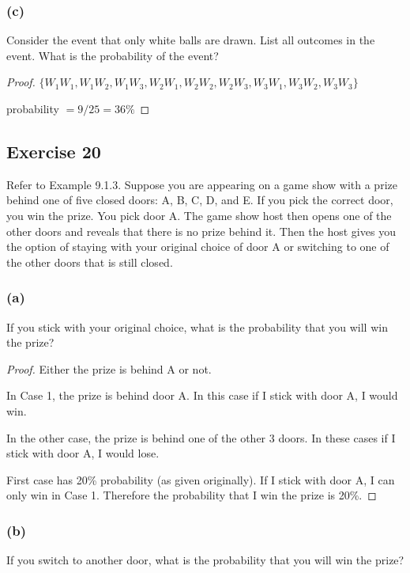 \documentclass[14pt]{extarticle}
\begin{document}
\subsubsection{(c)}
Consider the event that only white balls are drawn. List all outcomes in the event. 
What is the probability of the event?

\begin{proof}
\(\{W_1W_1, W_1W_2, W_1W_3, W_2W_1, W_2W_2, W_2W_3, W_3W_1, W_3W_2, W_3W_3\}\)

probability \(= 9/25 = 36\%\)
\end{proof}

\subsection{Exercise 20}
Refer to Example 9.1.3. Suppose you are appearing on a game show with a prize behind one of five closed doors: A, B, C, 
D, and E. If you pick the correct door, you win the prize. You pick door A. The game show host then opens one of the 
other doors and reveals that there is no prize behind it. Then the host gives you the option of staying with your 
original choice of door A or switching to one of the other doors that is still closed.

\subsubsection{(a)}
If you stick with your original choice, what is the probability that you will win the prize?

\begin{proof}
Either the prize is behind A or not.

In Case 1, the prize is behind door A. In this case if I stick with door A, I would win.

In the other case, the prize is behind one of the other 3 doors. In these cases if I stick with door A, I would lose. 

First case has 20\% probability (as given originally). If I stick with door A, I can only win in Case 1. Therefore the probability that I win the prize is 20\%.
\end{proof}

\subsubsection{(b)}
If you switch to another door, what is the probability that you will win the prize?
\end{document}
